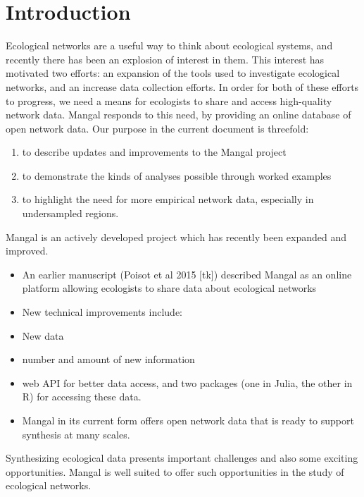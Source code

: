 \hypertarget{introduction}{%
\section{Introduction}\label{introduction}}

Ecological networks are a useful way to think about ecological systems,
and recently there has been an explosion of interest in them. This
interest has motivated two efforts: an expansion of the tools used to
investigate ecological networks, and an increase data collection
efforts. In order for both of these efforts to progress, we need a means
for ecologists to share and access high-quality network data. Mangal
responds to this need, by providing an online database of open network
data. Our purpose in the current document is threefold:

\begin{enumerate}
\def\labelenumi{\arabic{enumi}.}
\tightlist
\item
  to describe updates and improvements to the Mangal project
\item
  to demonstrate the kinds of analyses possible through worked examples
\item
  to highlight the need for more empirical network data, especially in
  undersampled regions.
\end{enumerate}

Mangal is an actively developed project which has recently been expanded
and improved.

\begin{itemize}
\tightlist
\item
  An earlier manuscript (Poisot et al 2015 {[}tk{]}) described Mangal as
  an online platform allowing ecologists to share data about ecological
  networks
\item
  New technical improvements include:
\item
  New data
\item
  number and amount of new information
\item
  web API for better data access, and two packages (one in Julia, the
  other in R) for accessing these data.
\item
  Mangal in its current form offers open network data that is ready to
  support synthesis at many scales.
\end{itemize}

Synthesizing ecological data presents important challenges and also some
exciting opportunities. Mangal is well suited to offer such
opportunities in the study of ecological networks.

